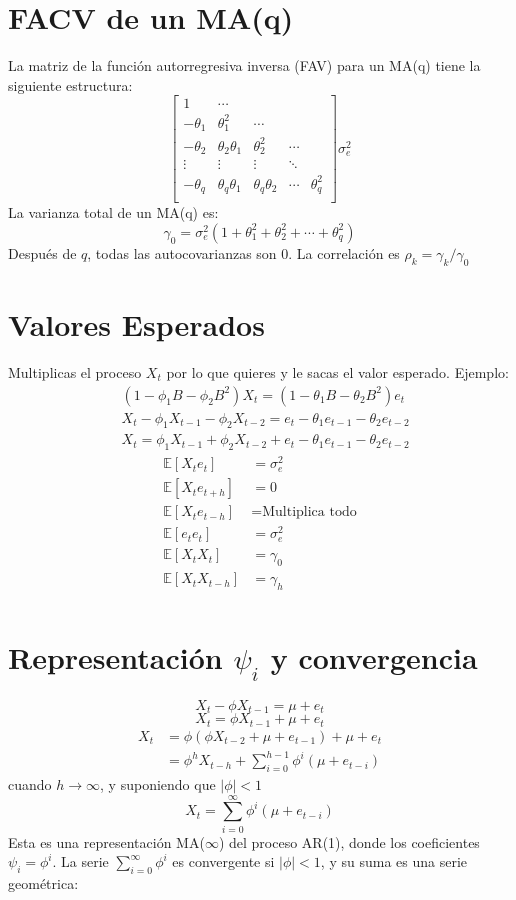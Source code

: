 \documentclass[12pt]{article} %
\begin{document}
\begin{multicols}{3}
\section*{FACV de un MA(q)}
La matriz de la función autorregresiva inversa (FAV) para un MA(q) tiene la siguiente estructura:
\[
\begin{bmatrix}
1 & \cdots \\
-\theta_1 & \theta_1^2 & \cdots \\
-\theta_2 & \theta_2\theta_1 & \theta_2^2 & \cdots \\
\vdots & \vdots & \vdots & \ddots &  \\
-\theta_q & \theta_q\theta_1 & \theta_q\theta_2 &\cdots & \theta_q^2 \\
\end{bmatrix}
\sigma^2_e
\]
La varianza total de un MA(q) es:
\[
\gamma_0 = \sigma_e^2 \left( 1 + \theta_1^2 + \theta_2^2 + \cdots + \theta_q^2 \right)
\]
Después de $q$, todas las autocovarianzas son 0.
La correlación es $\rho_k = \gamma_k/\gamma_0$
\section*{Valores Esperados}
Multiplicas el proceso $X_t$ por lo que quieres y le sacas el valor esperado. Ejemplo:
\vspace{-5pt}
\begin{align*}
&(1 - \phi_1 B - \phi_2 B^2) X_t = (1 - \theta_1 B - \theta_2 B^2) e_t \\
&X_t - \phi_1 X_{t-1} - \phi_2 X_{t-2} = e_t - \theta_1 e_{t-1} - \theta_2 e_{t-2} \\
&X_t = \phi_1 X_{t-1} + \phi_2 X_{t-2} + e_t - \theta_1 e_{t-1} - \theta_2 e_{t-2}
\end{align*}
\vspace{-20pt}
\begin{align*}
\mathbb{E}[X_t e_t] &= \sigma_e^2 \\
\mathbb{E}[X_t e_{t+h}] &= 0 \\
\mathbb{E}[X_t e_{t-h}] &= \text{Multiplica todo} \\
\mathbb{E}[e_t e_t] &= \sigma_e^2 \\
\mathbb{E}[X_t X_t] &= \gamma_0 \\
\mathbb{E}[X_t X_{t-h}] &= \gamma_h \\
\end{align*}
\section*{Representación \(\psi_i\) y convergencia}
\[
X_t - \phi X_{t-1} = \mu + e_t
\]
\[
X_t = \phi X_{t-1} + \mu + e_t
\]
\begin{align*}
X_t &= \phi (\phi X_{t-2} + \mu + e_{t-1}) + \mu + e_t \\
    &= \phi^h X_{t-h} + \sum_{i=0}^{h-1} \phi^i (\mu + e_{t-i})
\end{align*}
cuando \( h \to \infty \), y suponiendo que \( |\phi| < 1 \)
\[
X_t = \sum_{i=0}^{\infty} \phi^i (\mu + e_{t-i})
\]
Esta es una representación MA($\infty$) del proceso AR(1), donde los coeficientes \( \psi_i = \phi^i \). La serie \( \sum_{i=0}^{\infty} \phi^i \) es convergente si \( |\phi| < 1 \), y su suma es una serie geométrica:

\end{multicols}
\end{document}
